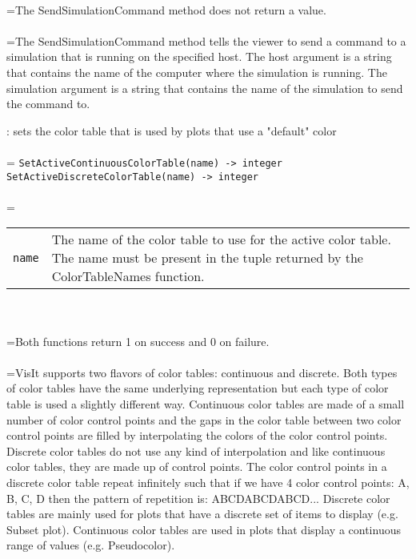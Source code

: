 \documentclass[10pt,a4paper]{report}
\begin{document}
 \\ 
\hangindent=\parindent The SendSimulationCommand method does not return a value. \\[-3mm] 

 \\ 
\hangindent=\parindent The SendSimulationCommand method tells the viewer to send a command to a simulation that is running on the specified host. The host argument is a string that contains the name of the computer where the simulation is running. The simulation argument is a string that contains the name of the simulation to send the command to. \\[-3mm] 

\newpage


{}
: sets the color table that is used by plots that use a "default" color\\[-3mm]

 \\ 
\hangindent=\parindent 
\verb!SetActiveContinuousColorTable(name) -> integer!\\ 
\verb!SetActiveDiscreteColorTable(name) -> integer!\\ [-3mm]

 \\ 
\hangindent=\parindent 
\begin{tabular}{lp{9cm}}
\verb!name! & The name of the color table to use for the active color table. The name must be present in the tuple returned by the ColorTableNames function. \\
\end{tabular} \\[-2mm]


 \\ 
\hangindent=\parindent Both functions return 1 on success and 0 on failure. \\[-3mm] 

 \\ 
\hangindent=\parindent VisIt supports two flavors of color tables: continuous and discrete. Both types of color tables have the same underlying representation but each type of color table is used a slightly different way. Continuous color tables are made of a small number of color control points and the gaps in the color table between two color control points are filled by interpolating the colors of the color control points. Discrete color tables do not use any kind of interpolation and like continuous color tables, they are made up of control points. The color control points in a discrete color table repeat infinitely such that if we have 4 color control points: A, B, C, D then the pattern of repetition is: ABCDABCDABCD... Discrete color tables are mainly used for plots that have a discrete set of items to display (e.g. Subset plot). Continuous color tables are used in plots that display a continuous range of values (e.g. Pseudocolor). \\[-3mm] 
\end{document}
